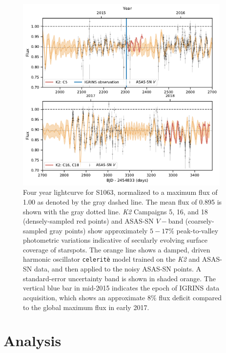\documentclass[trackchanges]{aastex631}
\begin{document}
\begin{figure}[ht]
  \centering
  \includegraphics[width=0.95\textwidth]{figures/2020_K2_ASASSN_lcurve_2panel.pdf}
\caption{Four year lightcurve for S1063, normalized to a maximum flux of 1.00 as denoted by the gray dashed line. The mean flux of 0.895 is shown with the gray dotted line.  \emph{K2} Campaigns 5, 16, and 18 (densely-sampled red points) and ASAS-SN $V-$band (coarsely-sampled gray points) show approximately $5-17\%$ peak-to-valley photometric variations indicative of secularly evolving surface coverage of starspots.  The orange line shows a damped, driven harmonic oscillator \texttt{celerit\`e} model \citep{2017AJ....154..220F} trained on the \emph{K2} and ASAS-SN data, and then applied to the noisy ASAS-SN points. A standard-error uncertainty band is shown in shaded orange. The vertical blue bar in mid-2015 indicates the epoch of IGRINS data acquisition, which shows an approximate $8\%$ flux deficit compared to the global maximum flux in early 2017.}
\label{fig:lightcurve}
\end{figure}


\section{Analysis}
\label{sec:analysis}
\end{document}
